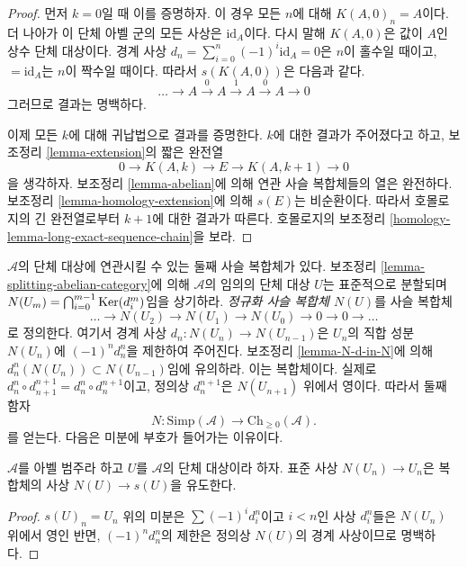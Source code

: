 \begin{proof}
먼저 $k = 0$일 때 이를 증명하자. 이 경우 모든 $n$에 대해
$K(A, 0)_n = A$이다. 더 나아가 이 단체 아벨 군의 모든 사상은
$\text{id}_A$이다. 다시 말해 $K(A, 0)$은 값이 $A$인 상수 단체 대상이다.
경계 사상 $d_n = \sum_{i = 0}^n (-1)^i \text{id}_A
= 0$은 $n$이 홀수일 때이고, $ = \text{id}_A$는 $n$이 짝수일 때이다.
따라서 $s(K(A, 0))$은 다음과 같다.
$$
\ldots \to A \xrightarrow{0} A \xrightarrow{1} A \xrightarrow{0} A \to 0
$$
그러므로 결과는 명백하다.

\medskip\noindent
이제 모든 $k$에 대해 귀납법으로 결과를 증명한다. $k$에 대한 결과가
주어졌다고 하고, 보조정리 \ref{lemma-extension}의 짧은 완전열
$$
0 \to K(A, k) \to E \to K(A, k + 1) \to 0
$$
을 생각하자. 보조정리 \ref{lemma-abelian}에 의해 연관 사슬 복합체들의
열은 완전하다. 보조정리 \ref{lemma-homology-extension}에 의해
$s(E)$는 비순환이다. 따라서 호몰로지의 긴 완전열로부터 $k + 1$에
대한 결과가 따른다. 호몰로지의 보조정리
\ref{homology-lemma-long-exact-sequence-chain}을 보라.
\end{proof}

\noindent
$\mathcal{A}$의 단체 대상에 연관시킬 수 있는 둘째 사슬 복합체가 있다.
보조정리 \ref{lemma-splitting-abelian-category}에 의해
$\mathcal{A}$의 임의의 단체 대상 $U$는 표준적으로 분할되며
$N(U_m) = \bigcap_{i = 0}^{m - 1} \mathop{\mathrm{Ker}}(d^m_i)$임을 상기하라.
{\it 정규화 사슬 복합체 $N(U)$}를 사슬 복합체
$$
\ldots \to N(U_2) \to N(U_1) \to N(U_0) \to 0 \to 0 \to \ldots
$$
로 정의한다. 여기서 경계 사상 $d_n : N(U_n) \to N(U_{n - 1})$은
$U_n$의 직합 성분 $N(U_n)$에 $(-1)^nd^n_n$을 제한하여 주어진다.
보조정리 \ref{lemma-N-d-in-N}에 의해
$d^n_n(N(U_n)) \subset N(U_{n - 1})$임에 유의하라. 이는 복합체이다.
실제로 $d^n_n \circ d^{n + 1}_{n + 1} = d^n_n \circ d^{n + 1}_n$이고,
정의상 $d^{n + 1}_n$은 $N(U_{n + 1})$ 위에서 영이다. 따라서 둘째 함자
$$
N : \text{Simp}(\mathcal{A}) \longrightarrow \text{Ch}_{\geq 0}(\mathcal{A}).
$$
를 얻는다. 다음은 미분에 부호가 들어가는 이유이다.

\begin{lemma}
\label{lemma-map-associated-complexes}
$\mathcal{A}$를 아벨 범주라 하고 $U$를 $\mathcal{A}$의 단체 대상이라
하자. 표준 사상 $N(U_n) \to U_n$은 복합체의 사상 $N(U) \to s(U)$을
유도한다.
\end{lemma}

\begin{proof}
$s(U)_n = U_n$ 위의 미분은 $\sum (-1)^i d^n_i$이고
$i < n$인 사상 $d^n_i$들은 $N(U_n)$ 위에서 영인 반면,
$(-1)^nd^n_n$의 제한은 정의상 $N(U)$의 경계 사상이므로 명백하다.
\end{proof}

